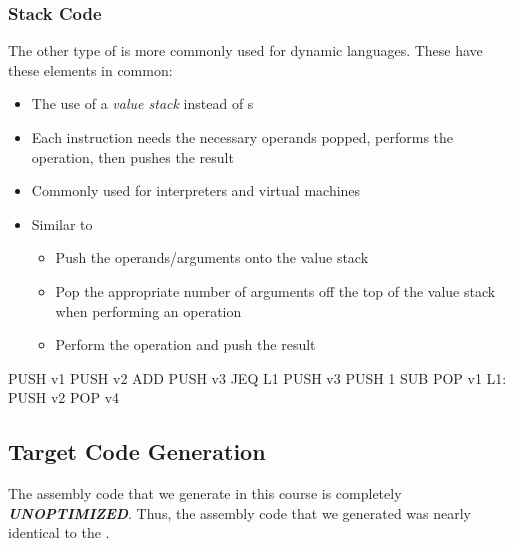 \subsubsection{Stack Code}\label{subsubsec:Stack_Code}
The other type of  is more commonly used for dynamic languages.
These have these elements in common:
\begin{itemize}[noitemsep]
\item The use of a \emph{value stack} instead of s
\item Each instruction needs the necessary operands popped, performs the operation, then pushes the result
\item Commonly used for interpreters and virtual machines
\item Similar to 
  \begin{itemize}[noitemsep]
  \item Push the operands/arguments onto the value stack
  \item Pop the appropriate number of arguments off the top of the value stack when performing an operation
  \item Perform the operation and push the result
  \end{itemize}
\end{itemize}

\begin{assemblysource}
  PUSH v1
  PUSH v2
  ADD
  PUSH v3
  JEQ L1
  PUSH v3
  PUSH 1
  SUB
  POP v1
  L1:
  PUSH v2
  POP v4
\end{assemblysource}

\subsection{Target Code Generation}\label{subsec:Target_Code_Generation}
The assembly code that we generate in this course is completely \textbf{\emph{UNOPTIMIZED}}.
Thus, the assembly code that we generated was nearly identical to the .

